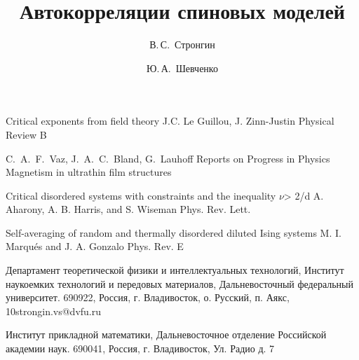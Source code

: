 \documentclass[10pt]{article}
\begin{document}
{\begin{thebibliography}{4}
\paper Critical exponents from field theory
\by J.C. Le Guillou, J. Zinn-Justin
\jour Physical Review B

\by C.~A.~F.~Vaz, J.~A.~C.~Bland, G.~Lauhoff
\jour Reports on Progress in Physics
\paper Magnetism in ultrathin film structures

\paper Critical disordered systems with constraints and the inequality $\nu$> 2/d
\by A. Aharony, A. B. Harris, and S. Wiseman
\jour Phys. Rev. Lett.

\paper Self-averaging of random and thermally disordered diluted Ising systems
\by M. I. Marqués and J. A. Gonzalo
\jour Phys. Rev. E

\end{thebibliography}
}




\title{Автокорреляции спиновых моделей}

\author[1,2]{В.\,С.~Стронгин}{Департамент теоретической физики и интеллектуальных технологий, Институт наукоемких технологий и передовых материалов, Дальневосточный федеральный университет. 690922, Россия, г. Владивосток, о. Русский, п. Аякс, 10}{strongin.vs@dvfu.ru}
\author[1,2]{Ю.\,А.~Шевченко}{Институт прикладной математики, Дальневосточное отделение Российской академии наук. 690041, Россия, г. Владивосток, Ул. Радио д. 7}{}




\makeface

\end{document}
